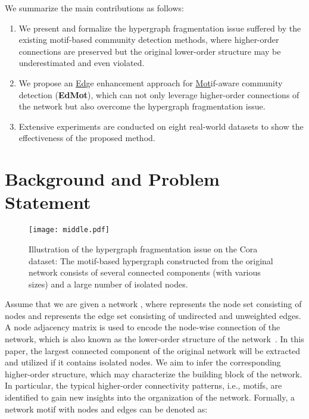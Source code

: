 \documentclass[sigconf]{acmart}
\begin{document}
We summarize the main contributions as follows:
\begin{enumerate}[{1)}]
\item
We present and formalize the hypergraph fragmentation issue suffered by the existing motif-based community detection methods, where higher-order connections are preserved but the original lower-order structure may be underestimated and even violated.
\item
We propose an \underline{Ed}ge enhancement approach for \underline{Mot}if-aware community detection (\textbf{EdMot}), which can not only leverage higher-order connections of the network but also overcome the hypergraph fragmentation issue.
\item
Extensive experiments are conducted on eight real-world datasets to show the effectiveness of the proposed method.
\end{enumerate}



\section{Background and Problem Statement}
\label{sec:background}



\begin{figure*}[!t]
\vskip-0.1in
\begin{center}
\centerline{ {} \hskip -0.1in
{{\texttt{[image: middle.pdf]}\label{fig:middle}}}\hskip -0.05in
{}
}
\end{center}
\vskip-0.1in
\caption{Illustration of the hypergraph fragmentation issue on the Cora dataset: The motif-based hypergraph constructed from the original network consists of several connected components (with various sizes) and a large number of isolated nodes.}
\label{fig:coracompare}
\vskip-0.1in
\end{figure*}

Assume that we are given a network , where  represents the node set consisting of  nodes and  represents the edge set consisting of  undirected and unweighted edges. A node adjacency matrix  is used to encode the node-wise connection of the network, which is also known as the lower-order structure of the network~\cite{benson2016higher}. In this paper, the largest connected component of the original network will be extracted and utilized if it contains isolated nodes. We aim to infer the corresponding higher-order structure, which may characterize the building block of the network. In particular, the typical higher-order connectivity patterns, i.e., motifs, are identified to gain new insights into the organization of the network.
Formally, a network motif with  nodes and  edges can be denoted as:
\end{document}
